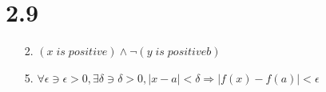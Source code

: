 \documentclass[sigconf]{article}
\begin{document}
\section*{2.9}
\begin{itemize}
  \item[2.] $(x \; is \; positive) \land \neg(y \; is \; positiveb)$
  \item[5.] $\forall \epsilon \ni \epsilon > 0, \exists \delta \ni \delta > 0, |x-a| < \delta \Rightarrow |f(x)-f(a)| < \epsilon $
\end{itemize}




\end{document}
